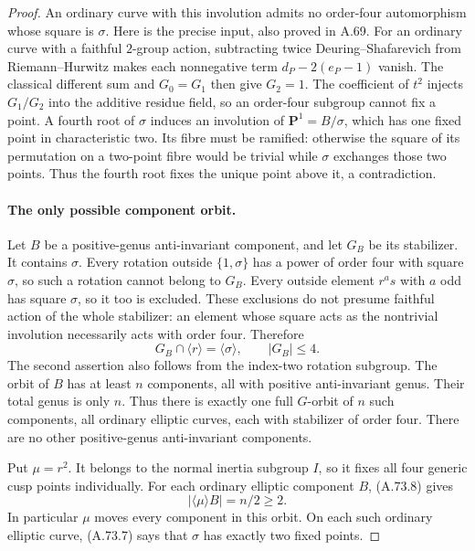 \begin{proof}
An ordinary curve with this involution admits no order-four
automorphism whose square is \(\sigma\). Here is the precise
input, also proved in A.69. For an ordinary curve with a
faithful \(2\)-group action, subtracting twice
Deuring--Shafarevich from Riemann--Hurwitz makes each
nonnegative term \(d_P-2(e_P-1)\) vanish. The classical
different sum and \(G_0=G_1\) then give \(G_2=1\).
The coefficient of \(t^2\) injects \(G_1/G_2\) into the
additive residue field, so an order-four subgroup cannot
fix a point. A fourth root of \(\sigma\) induces an
involution of \(\mathbf P^1=B/\sigma\), which has one
fixed point in characteristic two. Its fibre must be
ramified: otherwise the square of its permutation on a
two-point fibre would be trivial while \(\sigma\) exchanges
those two points. Thus the fourth root fixes the unique
point above it, a contradiction.
\cite[\S2.2, equation (3) and Exercise 2.12(c)]{fghBouwWewers}

\paragraph{The only possible component orbit.}
Let \(B\) be a positive-genus anti-invariant component, and
let \(G_B\) be its stabilizer. It contains \(\sigma\).
Every rotation outside \(\{1,\sigma\}\) has a power
of order four with square \(\sigma\), so such a rotation
cannot belong to \(G_B\). Every outside element \(r^a s\)
with \(a\) odd has square \(\sigma\), so it too is
excluded. These exclusions do not presume faithful action
of the whole stabilizer: an element whose square acts as
the nontrivial involution necessarily acts with order four.
Therefore
\[
             G_B\cap\langle r\rangle=\langle\sigma\rangle,
             \qquad |G_B|\le4.                       \tag{A.73.8}
\]
The second assertion also follows from the index-two rotation
subgroup. The orbit of \(B\) has at least \(n\) components,
all with positive anti-invariant genus. Their total genus is
only \(n\). Thus there is exactly one full \(G\)-orbit of
\(n\) such components, all ordinary elliptic curves, each
with stabilizer of order four. There are no other
positive-genus anti-invariant components.

Put \(\mu=r^2\). It belongs to the normal inertia subgroup
\(I\), so it fixes all four generic cusp points individually.
For each ordinary elliptic component \(B\), (A.73.8) gives
\[
            |\langle\mu\rangle B|=n/2\ge2.
                                                        \tag{A.73.9}
\]
In particular \(\mu\) moves every component in this orbit.
On each such ordinary elliptic curve, (A.73.7) says that
\(\sigma\) has exactly two fixed points.


\end{proof}
